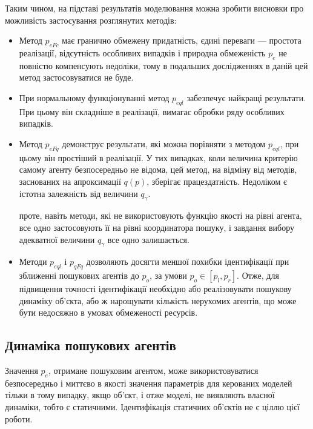 Таким чином, на підставі результатів моделювання можна зробити висновки про
можливість застосування розглянутих методів:


\begin{itemize}

  \item
    Метод $p_{eFc}$ має гранично  обмежену придатність,
    єдині переваги --- простота реалізації,
    відсутність особливих випадків і природна обмеженість
    $ p_e $ не повністю компенсують недоліки, тому в подальших
    дослідженнях в даній цей метод застосовуватися не буде.

  \item
    При нормальному функціонуванні метод $p_{eql}$ забезпечує найкращі
    результати. При цьому він складніше в реалізації, вимагає обробки ряду
    особливих випадків.

  \item
    Метод $p_{eFq}$ демонструє результати, які можна
    порівняти з методом $p_{eql}$, при цьому він простіший в реалізації. У тих
    випадках, коли величина критерію самому агенту безпосередньо не відома, цей
    метод, на відміну від методів, заснованих на апроксимації $q (p)$, зберігає
    працездатність. Недоліком є істотна залежність від величини $q_\gamma$.

    проте, навіть методи, які не використовують функцію якості на
    рівні агента, все одно застосовують її на рівні координатора
    пошуку, і завдання вибору адекватної величини
    $ q_\gamma $ все одно залишається.

  \item
    Методи $p_{eql}$ і $p_{qFq}$ дозволяють досягти меншої похибки
    ідентифікації при зближенні пошукових агентів до $p_o$, за умови $p_o \in [p_l, p_r]$.
    Отже, для підвищення точності ідентифікації необхідно або
    реалізовувати пошукову динаміку об'єкта, або ж нарощувати
    кількість нерухомих агентів, що може бути недосяжно в умовах
    обмеженості ресурсів.


\end{itemize}





\subsection{Динаміка пошукових агентів}%

Значення $p_e$, отримане пошуковим агентом, може використовуватися
безпосередньо і миттєво в якості значення параметрів для керованих моделей
тільки в тому випадку, якщо об'єкт, і отже моделі, не виявляють власної
динаміки, тобто є статичними. Ідентифікація статичних об'єктів не є ціллю
цієї роботи.

